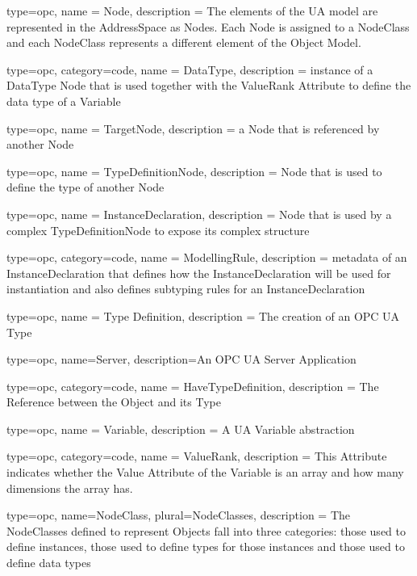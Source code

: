 


{
  type=opc,
  name = {Node},
  description = {The elements of the UA model are represented in the AddressSpace as Nodes. Each Node is assigned to a NodeClass and each NodeClass represents a different element of the Object Model.}
}

{
  type=opc,
  category=code,
  name = {DataType},
  description = {instance of a DataType Node that is used together with the ValueRank Attribute to define the data type of a Variable}
}

{
  type=opc,
  name = {TargetNode},
  description = {a Node that is referenced by another Node}
}

{
  type=opc,
  name = {TypeDefinitionNode},
  description = {Node that is used to define the type of another Node}
}


{
  type=opc,
  name = {InstanceDeclaration},
  description = {Node that is used by a complex \gls{TypeDefinitionNode} to expose its complex structure}
}

{
  type=opc,
  category=code,
  name = {ModellingRule},
  description = {metadata of an InstanceDeclaration that defines how the \gls{InstanceDeclaration} will be used for instantiation and also defines subtyping rules for an \gls{InstanceDeclaration}}
}

{
  type=opc,
  name = {Type Definition},
  description = {The creation of an OPC UA Type}
}

{
  type=opc,
  name=Server,
  description={An OPC UA Server Application}
}

{
  type=opc,
  category=code,
  name = {HaveTypeDefinition},
  description = {The \gls{Reference} between the \gls{Object} and its \gls{Type}}
}

{
  type=opc,
  name = {Variable},
  description = {A UA Variable abstraction}
}

{
  type=opc,
  category=code,
  name = {ValueRank},
  description = {This Attribute indicates whether the Value Attribute of the Variable is an array and how many dimensions the array has.}
}

{
  type=opc,
  name=NodeClass,
  plural=NodeClasses,
  description = {The NodeClasses defined to represent Objects fall into three categories: those used to define instances, those used to define types for those instances and those used to define data types}
}

